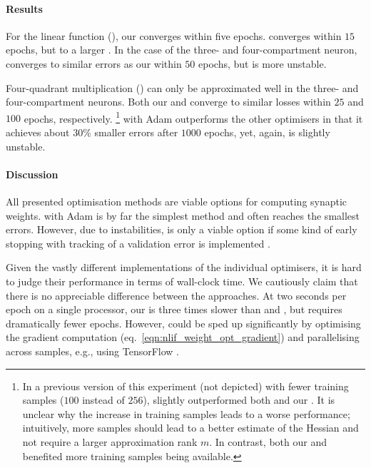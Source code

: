\paragraph{Results}
For the linear function (), our \SQP converges within five epochs. \BFGS converges within $15$ epochs, but to a larger \NRMSE.
In the case of the three- and four-compartment neuron, \SGD converges to similar errors as our \SQP within $50$ epochs, but is more unstable.

Four-quadrant multiplication () can only be approximated well in the three- and four-compartment neurons.
Both our \SQP and \LBFGSB converge to similar losses within $25$ and $100$ epochs, respectively.%
\footnote{In a previous version of this experiment (not depicted) with fewer training samples ($100$ instead of $256$), \LBFGSB slightly outperformed both \SGD and our \SQP.
It is unclear why the increase in training samples leads to a worse performance; intuitively, more samples should lead to a better estimate of the Hessian and not require a larger approximation rank $m$.
In contrast, both our \SQP and \SGD benefited more training samples being available.
}
\SGD with Adam outperforms the other optimisers in that it achieves about $30\%$ smaller errors after $1000$ epochs, yet, again, is slightly unstable.

\paragraph{Discussion}
All presented optimisation methods are viable options for computing synaptic weights.
\SGD with Adam is by far the simplest method and often reaches the smallest errors.
However, due to instabilities, \SGD is only a viable option if some kind of early stopping with tracking of a validation error is implemented \citep[e.g.,][Section~7.1]{goodfellow2016deep}.

Given the vastly different implementations of the individual optimisers, it is hard to judge their performance in terms of wall-clock time.
We cautiously claim that there is no appreciable difference between the approaches.
At two seconds per epoch on a single processor, our \SQP is three times slower than \LBFGSB and \SGD, but requires dramatically fewer epochs.
However, \SGD could be sped up significantly by optimising the gradient computation (eq.~\ref{eqn:nlif_weight_opt_gradient}) and parallelising across samples, e.g., using TensorFlow \citep{abadi2016tensorflow}.

